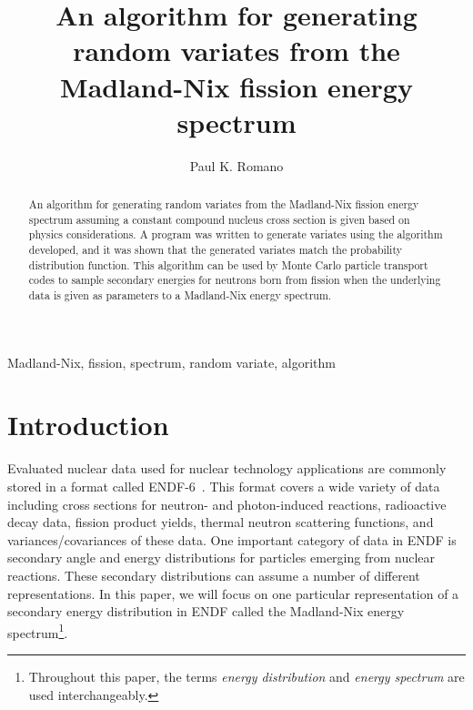 \documentclass[5p]{elsarticle}
\begin{document}
\title{An algorithm for generating random variates from the Madland-Nix fission
  energy spectrum}

\author{Paul K. Romano}

\address{Bechtel Marine Propulsion Corporation -- Knolls Atomic Power
  Laboratory \\ P.O. Box 1072, Schenectady, NY 12301, United States}

\begin{abstract}
  An algorithm for generating random variates from the Madland-Nix fission
  energy spectrum assuming a constant compound nucleus cross section is given
  based on physics considerations. A program was written to generate variates
  using the algorithm developed, and it was shown that the generated variates
  match the probability distribution function. This algorithm can be used by
  Monte Carlo particle transport codes to sample secondary energies for neutrons
  born from fission when the underlying data is given as parameters to a
  Madland-Nix energy spectrum.
\end{abstract}

\begin{keyword}
  Madland-Nix, fission, spectrum, random variate, algorithm
\end{keyword}

\maketitle

\section{Introduction}

Evaluated nuclear data used for nuclear technology applications are commonly
stored in a format called ENDF-6~\cite{bnl-trkov-2012}. This format covers a
wide variety of data including cross sections for neutron- and photon-induced
reactions, radioactive decay data, fission product yields, thermal neutron
scattering functions, and variances/covariances of these data. One important
category of data in ENDF is secondary angle and energy distributions for
particles emerging from nuclear reactions. These secondary distributions can
assume a number of different representations. In this paper, we will focus on
one particular representation of a secondary energy distribution in ENDF called
the Madland-Nix energy spectrum\footnote{Throughout this paper, the terms
  \textit{energy distribution} and \textit{energy spectrum} are used
  interchangeably.}.
\end{document}
